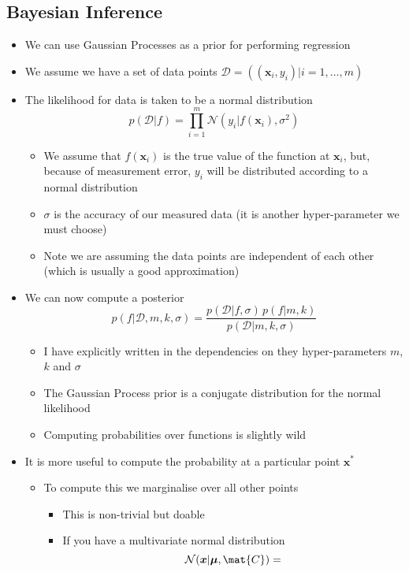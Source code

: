\documentclass[11pt]{article}
\begin{document}
\subsection{Bayesian Inference}
\label{sec:org241aa28}
\begin{itemize}
\item We can use Gaussian Processes as a prior for performing regression
\item We assume we have a set of data points \(\mathcal{D} = \left( (\bm{x}_i, y_i)
      \big\vert i=1,\ldots, m \right)\)
\item The likelihood for data  is taken to be a normal distribution
$$ p(\mathcal{D}| f) = \prod_{i=1}^m 
      \mathcal{N}\left(y_i \big\vert f(\bm{x}_i), \sigma^2\right) $$
\begin{itemize}
\item We assume that \(f(\bm{x}_i)\) is the true value of the function
at \(\bm{x}_i\), but, because of measurement error, \(y_i\) will be
distributed according to a normal distribution
\item \(\sigma\) is the accuracy of our measured data (it is another
hyper-parameter we must choose)
\item Note we are assuming the data points are independent of each other
(which is usually a good approximation)
\end{itemize}
\item We can now compute a posterior
$$ p(f|\mathcal{D}, m, k, \sigma) = \frac{p(\mathcal{D}| f, \sigma)  \,
     p(f|m,k)}{p(\mathcal{D}|m,k,\sigma)}  $$ 
\begin{itemize}
\item I have explicitly written in the dependencies on they
hyper-parameters \(m\), \(k\) and \(\sigma\)
\item The Gaussian Process prior is a conjugate distribution for the
normal likelihood
\item Computing probabilities over functions is slightly wild
\end{itemize}
\item It is more useful to compute the probability at a particular
point \(\bm{x}^*\)
\begin{itemize}
\item To compute this we marginalise over all other points
\begin{itemize}
\item This is non-trivial but doable
\item If you have a multivariate normal distribution
$$ \mathcal{N}(\bm{x}| \bm{\mu},\mat{C}) =
$$
\end{itemize}
\end{itemize}
\end{itemize}
\end{document}
